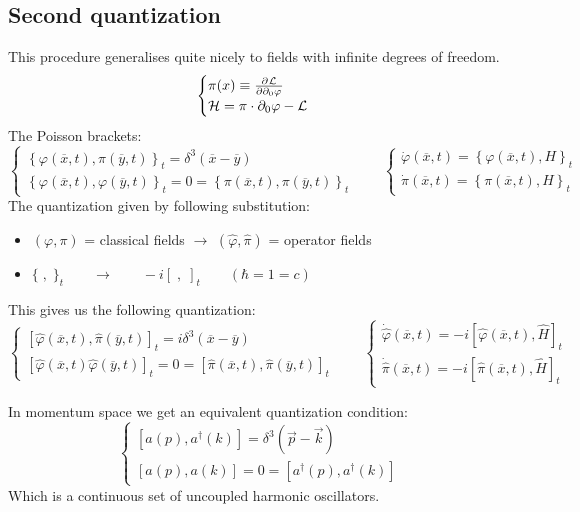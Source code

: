 \subsection{Second quantization}
This procedure generalises quite nicely to fields with infinite degrees of freedom.
\[ \begin{cases}
\pi(x) \equiv  \frac{\partial{^{}}\mathcal{L}}{\partial{{\partial_0\varphi}^{}}}  \\ \mathcal{H} = \pi\cdot\partial_0\varphi - \mathcal{L}
\end{cases} \]
The Poisson brackets:
\[ \begin{cases}
\left\{\varphi(\overline{x},t),\pi(\overline{y},t)\right\}_t = \delta^3(\overline{x}- \overline{y}) \\ \left\{\varphi(\overline{x},t),\varphi(\overline{y},t)\right\}_t = 0 = \left\{\pi(\overline{x},t),\pi(\overline{y},t)\right\}_t
\end{cases} \qquad \begin{cases}
\dot{\varphi}(\overline{x},t) = \left\{\varphi(\overline{x},t),H\right\}_t \\ \dot{\pi}(\overline{x},t) = \left\{\pi(\overline{x},t), H\right\}_t
\end{cases}\]
The quantization given by following substitution:
\begin{itemize}
\item $(\varphi, \pi)$ = classical fields $\to$ $(\hat{\varphi}, \hat{\pi})$ = operator fields
\item $\{\;,\;\}_t \qquad \to \qquad -i[\;,\;]_t \qquad (\hbar = 1 =c)$
\end{itemize}
This gives us the following quantization:
\[ \begin{cases}
\left[\hat{\varphi}(\overline{x},t), \hat{\pi}(\overline{y},t)\right]_t = i\delta^3(\overline{x}- \overline{y}) \\
\left[\hat{\varphi}(\overline{x},t)\hat{\varphi}(\overline{y},t)\right]_t = 0 = \left[\hat{\pi}(\overline{x},t), \hat{\pi}(\overline{y},t)\right]_t
\end{cases} \qquad \begin{cases}
\dot{\hat{\varphi}}(\overline{x},t) = -i \left[\hat{\varphi}(\overline{x},t), \hat{H}\right]_t \\
\dot{\hat{\pi}}(\overline{x},t) = -i \left[\hat{\pi}(\overline{x},t), \hat{H}\right]_t
\end{cases}\]



In momentum space we get an equivalent quantization condition:
\[ \begin{cases}
\left[a(p), a^\dagger(k)\right] = \delta^3(\vec{p}- \vec{k}) \\
\left[a(p),a(k)\right] = 0 = \left[a^\dagger(p), a^\dagger(k)\right]
\end{cases} \]
Which is a continuous set of uncoupled harmonic oscillators.

